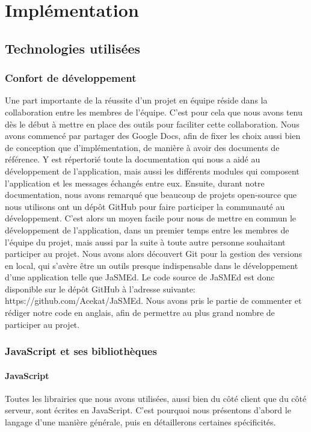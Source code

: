 \documentclass[pdftex,12pt,a4paper]{article}
\begin{document}
\section{Implémentation}

\subsection{Technologies utilisées}

\subsubsection{Confort de développement}

Une part importante de la réussite d’un projet en équipe réside dans la collaboration entre les membres de l’équipe. C’est pour cela que nous avons tenu dès le début à mettre en place des outils pour faciliter cette collaboration.
Nous avons commencé par partager des Google Docs, afin de fixer les choix aussi bien de conception que d’implémentation, de manière à avoir des documents de référence. Y est répertorié toute la documentation qui nous a aidé au développement de l’application, mais aussi les différents modules qui composent l’application et les messages échangés entre eux.
Ensuite, durant notre documentation, nous avons remarqué que beaucoup de projets open-source que nous utilisons ont un dépôt GitHub pour faire participer la communauté au développement. C’est alors un moyen facile pour nous de mettre en commun le développement de l’application, dans un premier temps entre les membres de l’équipe du projet, mais aussi par la suite à toute autre personne souhaitant participer au projet.
Nous avons alors découvert Git pour la gestion des versions en local, qui s’avère être un outils presque indispensable dans le développement d’une application telle que JaSMEd.
Le code source de JaSMEd est donc disponible sur le dépôt GitHub à l’adresse suivante: https://github.com/Acekat/JaSMEd. Nous avons pris le partie de commenter et rédiger notre code en anglais, afin de permettre au plus grand nombre de participer au projet.

\subsubsection{JavaScript et ses bibliothèques}

\paragraph{JavaScript}
Toutes les librairies que nous avons utilisées, aussi bien du côté client que du côté serveur, sont écrites en JavaScript. C’est pourquoi nous présentons d’abord le langage d’une manière générale, puis en détaillerons certaines spécificités.
\end{document}
